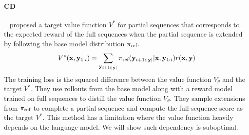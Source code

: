 



\paragraph{CD}~\citet{mudgalcontrolled} proposed a target value function $V^*$ for partial sequences that corresponds to the expected reward of the full sequences when the partial sequence is extended by following the base model distribution $\pi_\text{ref}$.
%
\begin{equation}
    V^*({\mathbf{x}}, {\mathbf{y}}_{1:i}) = \sum_{{\mathbf{y}}_{i+1:|{\mathbf{y}}|}} \pi_\text{ref}({\mathbf{y}}_{i+1:|{\mathbf{y}}|}|{\mathbf{x}},{\mathbf{y}}_{1:i}) r({\mathbf{x}}, {\mathbf{y}})
\end{equation}
%
The training loss is the squared difference between the value function $V_\theta$ and the target $V^*$. They use rollouts from the base model along with a reward model trained on full sequences to distill the value function $V_\theta$. They sample extensions from $\pi_\text{ref}$ to complete a partial sequence and compute the full-sequence score as the target $V^*$. This method has a limitation where the value function heavily depends on the language model. We will show such dependency is suboptimal. 


